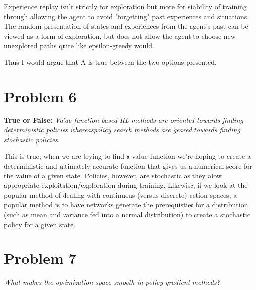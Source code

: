 \documentclass{article}
\begin{document}
Experience replay isn't strictly for exploration but more for stability of training through allowing the agent to avoid "forgetting" past experiences and situations. The random presentation of states and experiences from the agent's past can be viewed as a form of exploration, but does not allow the agent to choose new unexplored paths quite like epsilon-greedy would.

Thus I would argue that A is true between the two options presented.

\section*{Problem 6}
\textbf{True or False:} \textit{Value function-based RL methods are oriented towards finding deterministic policies whereaspolicy search methods are geared towards finding stochastic policies.}

This is true; when we are trying to find a value function we're hoping to create a deterministic and ultimately accurate function that gives us a numerical score for the value of a given state. Policies, however, are stochastic as they alow appropriate exploitation/exploration during training. Likewise, if we look at the popular method of dealing with continuous (versus discrete) action spaces, a popular method is to have networks generate the prerequisties for a distribution (such as mean and variance fed into a normal distribution) to create a stochastic policy for a given state.

\section*{Problem 7}
\textit{What makes the optimization space smooth in policy gradient methods?}
\end{document}
